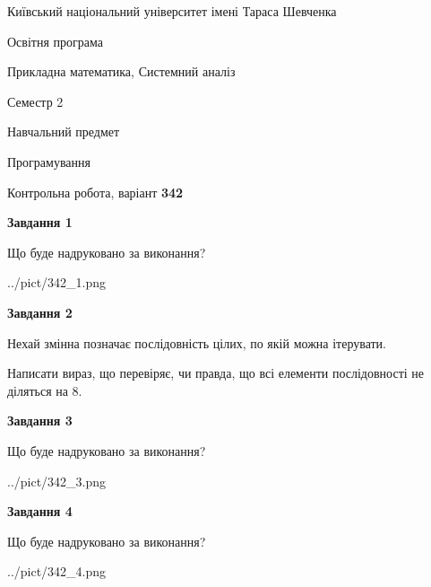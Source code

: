 \documentclass[12pt, ukrainian]{article}
\begin{document}
{{\begin {small}\par
{ \center  Київський національний університет імені Тараса Шевченка \par}
{\parbox {5 cm}{Освітня програма \hfill}{\parbox {8 cm}{Прикладна математика, Системний аналіз \hfill}}\parbox {5 cm}{\hfill Семестр 2}}\par
{\parbox {5 cm} {Навчальний предмет \hfill}\parbox {7 cm}{Програмування \hfill}\parbox {6cm}{\hfill}\par}\vspace{-7pt} \end{small}}{\center Контрольна робота, варіант  \No \textbf
{ 342 }\par}}
{
\begin {large}
{\begin {center}\textbf{Завдання 1}\end {center}}\par
Що буде надруковано за виконання?\par\par
\begin{center}
	{../pict/342_1.png}
\end{center}
\newpage

{\begin {center}\textbf{Завдання 2}\end {center}}\par
Нехай змінна  позначає послідовність цілих, по якій можна ітерувати.

Написати вираз, що перевіряє, чи правда, що всі елементи послідовності не діляться на 8.\par
\newpage

{\begin {center}\textbf{Завдання 3}\end {center}}\par
Що буде надруковано за виконання?
\begin{center}
	{../pict/342_3.png}
\end{center}
\newpage

{\begin {center}\textbf{Завдання 4}\end {center}}\par
Що буде надруковано за виконання?\par
\begin{center}
	{../pict/342_4.png}
\end{center}
\newpage


\end{large}}
\end{document}
